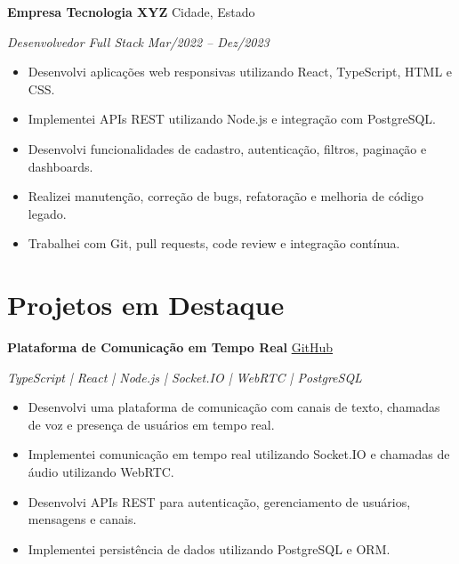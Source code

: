 \documentclass[a4paper,10pt]{article}
\begin{document}
\vspace{0.01cm}

\textbf{Empresa Tecnologia XYZ}
\hfill
Cidade, Estado

\textit{Desenvolvedor Full Stack}
\hfill
\textit{Mar/2022 -- Dez/2023}

\begin{itemize}

    \item Desenvolvi aplicações web responsivas utilizando React, TypeScript, HTML e CSS.

    \item Implementei APIs REST utilizando Node.js e integração com PostgreSQL.

    \item Desenvolvi funcionalidades de cadastro, autenticação, filtros, paginação e dashboards.

    \item Realizei manutenção, correção de bugs, refatoração e melhoria de código legado.

    \item Trabalhei com Git, pull requests, code review e integração contínua.

\end{itemize}


\section{Projetos em Destaque}

\textbf{Plataforma de Comunicação em Tempo Real}
\hfill
\href{https://github.com/usuario/projeto}{GitHub}

\textit{TypeScript | React | Node.js | Socket.IO | WebRTC | PostgreSQL}

\begin{itemize}

    \item Desenvolvi uma plataforma de comunicação com canais de texto, chamadas de voz e presença de usuários em tempo real.

    \item Implementei comunicação em tempo real utilizando Socket.IO e chamadas de áudio utilizando WebRTC.

    \item Desenvolvi APIs REST para autenticação, gerenciamento de usuários, mensagens e canais.

    \item Implementei persistência de dados utilizando PostgreSQL e ORM.

\end{itemize}
\end{document}
